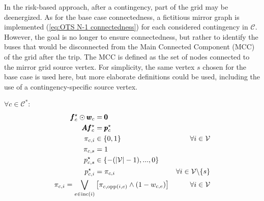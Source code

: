In the risk-based approach, after a contingency, part of the grid may be
deenergized. As for the base case connectedness, a fictitious mirror graph is
implemented (\ref{eq:OTS N-1 connectedness}) for each considered contingency in
$\mathcal{C}$. However, the goal is no longer to ensure connectedness, but rather
to identify the buses that would be disconnected from the Main Connected Component
(MCC) of the grid after the trip. The MCC is defined as the set of nodes connected to the mirror grid source vertex. For simplicity, the same vertex $s$ chosen for the base case is used here, but more elaborate definitions could be used, including the use of a contingency-specific source vertex. 

$\forall c \in \mathcal{C}^{*}$:
\begin{subequations}
    \allowdisplaybreaks
    \begin{align}
        \pmb{f}_{c}^{\star}\odot \pmb{w}_{c}     & = \pmb{0}\label{subeq:N-1 connecteness branch opening}                           \\
        \pmb{A}\pmb{f}_{c}^{\star}               & = \pmb{p}^{\star}_{c}\label{subeq:N-1 connectedness conservation}                \\
        \pi_{c,i}                                & \in \{0, 1\}                                                                    & \forall i \in \mathcal{V}\label{subeq:N-1 connectedness pi declaration}  \\
        \pi_{c,s}                                & = 1 \label{subeq:N-1 connectedness set source}                                   \\
        p^{\star}_{c, s}                         & \in \{-(|\mathcal{V}| - 1) , ..., 0\} \label{subeq:N-1 connectedness source set} \\
        p^{\star}_{c,i}                          & = \pi_{c,i}                                                                     & \forall i \in \mathcal{V}\backslash \{s\} \label{subeq:N-1 pi consumers} \\
        \pi_{c,i}= \bigvee_{e \in \text{inc}(i)} & \left[ \pi_{c,\text{opp}(i,e)}\wedge(1-w_{c,e})  \right]                                      & \forall i \in \mathcal{V}\label{subeq:N-1 connectedness pi disjunction}
    \end{align}
    \label{eq:OTS N-1 connectedness}
\end{subequations}

